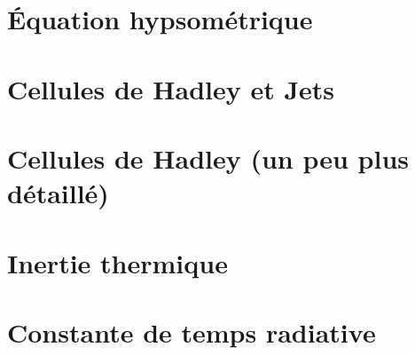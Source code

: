 \documentclass[a4paper,DIV16,10pt]{scrartcl}
\begin{document}
\newpage
\section{\'Equation hypsométrique}


\newpage
\section{Cellules de Hadley et Jets}


\newpage
\section{Cellules de Hadley (un peu plus détaillé)}


\newpage
\section{Inertie thermique}


\newpage
\section{Constante de temps radiative}

\end{document}
